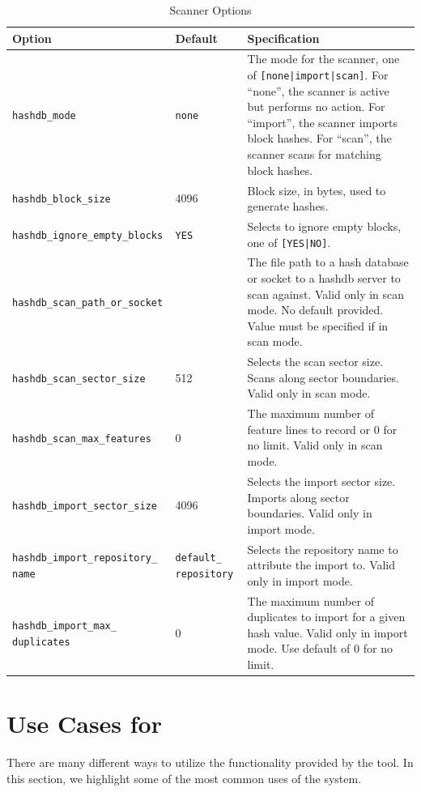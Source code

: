 \documentclass[11pt,fleqn]{article} %
\begin{document}
\begin{table}[!ht]

\centering
\caption{\bulk \hdb Scanner Options}
\label{tab:hashdbScannerUsage}
\begin{tabular}{|p{5 cm}|p{2.0 cm}|p{6.5 cm}|}
\hline \hline
\textbf{Option} & \textbf{Default} & \textbf{Specification} \\
\hline
\verb+hashdb_mode+ & \verb+none+ & The mode for the scanner, one of \verb+[none|import|scan]+. For ``none'', the scanner is active but performs no action. For ``import'', the scanner imports block hashes. For ``scan'', the scanner scans for matching block hashes.\\
\hline
\verb+hashdb_block_size+ &4096 & Block size, in bytes, used to generate hashes.\\
\hline
\verb+hashdb_ignore_empty_blocks+ & \verb+YES+ &Selects to ignore empty blocks,  one of \verb+[YES|NO]+.\\
\hline
\verb+hashdb_scan_path_or_socket+ & & The file path to a hash database or socket to a hashdb server to scan against.  Valid only in scan mode. No default provided. Value must be specified if in scan mode.\\
\hline
\verb+hashdb_scan_sector_size+ & 512 &Selects the scan sector size.  Scans along sector boundaries.  Valid only in scan mode.\\
\hline
\verb+hashdb_scan_max_features+ & 0 &The maximum number of feature lines to record or 0 for no limit.  Valid only in scan mode.\\
\hline
\verb+hashdb_import_sector_size+ & 4096 & Selects the import sector size.  Imports along sector boundaries.  Valid only in import mode.\\
\hline
\verb+hashdb_import_repository_+ \verb+name+ & \verb+default_+ \verb+repository+ &Selects the repository name to attribute the import to.  Valid only in import mode.\\
\hline
\verb+hashdb_import_max_+ \verb+duplicates+ & 0 &The maximum number of duplicates to import for a given hash value.  Valid only in import mode. Use default of 0 for no limit.\\
\hline
\end{tabular}
\end{table}

\section{Use Cases for \hash}
\label{UseCases}
There are many different ways to utilize the functionality provided by the \hash tool. In this section, we highlight some of the most common uses of the system.
\end{document}
